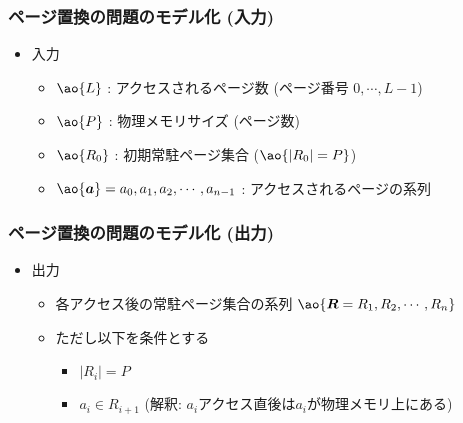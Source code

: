 \documentclass[12pt,dvipdfmx]{beamer}
\begin{document}
\begin{frame}
  \frametitle{ページ置換の問題のモデル化 (入力)}
  \begin{itemize}
  \item 入力
    \begin{itemize}
    \item $\ao{L}$ : アクセスされるページ数 (ページ番号 $0, \cdots, L-1$)
    \item $\ao{P}$ : 物理メモリサイズ (ページ数) 
    \item $\ao{R_0}$ : 初期常駐ページ集合 ($\ao{|R_0| = P}$)
    \item $\ao{\boldsymbol{a}} = a_0, a_1, a_2, \cdots , a_{n-1}$ : アクセスされるページの系列
    \end{itemize}
  \end{itemize}

  \begin{center}
    \def\svgwidth{\textwidth}
    {\scriptsize}
  \end{center}
\end{frame}

\begin{frame}
  \frametitle{ページ置換の問題のモデル化 (出力)}
  \begin{itemize}
  \item 出力
    \begin{itemize}
    \item 各アクセス後の常駐ページ集合の系列
      $\ao{{\boldsymbol{R}} = R_1, R_2, \cdots, R_n}$
    \item ただし以下を条件とする
      \begin{itemize}
      \item $|R_i| = P$ 
      \item $a_i \in R_{i+1}$
        (解釈: $a_i$アクセス直後は$a_i$が物理メモリ上にある)
      \end{itemize}
    \end{itemize}
  \end{itemize}

  \begin{center}
    \def\svgwidth{\textwidth}
    {\scriptsize}
  \end{center}
\end{frame}
    
\end{document}
